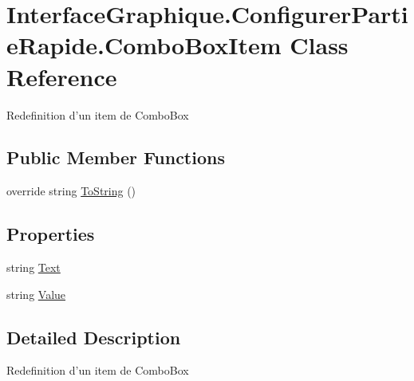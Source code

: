 \hypertarget{class_interface_graphique_1_1_configurer_partie_rapide_1_1_combo_box_item}{\section{Interface\-Graphique.\-Configurer\-Partie\-Rapide.\-Combo\-Box\-Item Class Reference}
\label{class_interface_graphique_1_1_configurer_partie_rapide_1_1_combo_box_item}
}


Redefinition d'un item de Combo\-Box  


\subsection*{Public Member Functions}
\begin{DoxyCompactItemize}
\item 
override string \hyperlink{class_interface_graphique_1_1_configurer_partie_rapide_1_1_combo_box_item_a4a2b0823abcb47c073d44ad318864a29}{To\-String} ()
\end{DoxyCompactItemize}
\subsection*{Properties}
\begin{DoxyCompactItemize}
\item 
string \hyperlink{class_interface_graphique_1_1_configurer_partie_rapide_1_1_combo_box_item_a49c8c93698b147b8cf0a7e4f7b20fc3e}{Text}
\item 
string \hyperlink{class_interface_graphique_1_1_configurer_partie_rapide_1_1_combo_box_item_abe3a9af3f056a3f9b78355ba4a352cda}{Value}
\end{DoxyCompactItemize}


\subsection{Detailed Description}
Redefinition d'un item de Combo\-Box 




